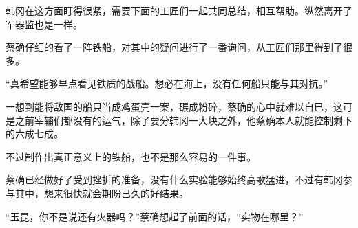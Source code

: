 韩冈在这方面盯得很紧，需要下面的工匠们一起共同总结，相互帮助。纵然离开了军器监也是一样。

蔡确仔细的看了一阵铁船，对其中的疑问进行了一番询问，从工匠们那里得到了很多。

“真希望能够早点看见铁质的战船。想必在海上，没有任何船只能与其对抗。”

一想到能将敌国的船只当成鸡蛋壳一案，碾成粉碎，蔡确的心中就难以自已，这可是之前宰辅们都没有的运气，除了要分韩冈一大块之外，他蔡确本人就能控制剩下的六成七成。

不过制作出真正意义上的铁船，也不是那么容易的一件事。

蔡确已经做好了受到挫折的准备，没有什么实验能够始终高歌猛进，不过有韩冈参与其中，想来很快就会期盼已久的好结果。

“玉昆，你不是说还有火器吗？”蔡确想起了前面的话，“实物在哪里？”

